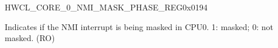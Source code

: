 \begin{register}{H}{WCL\_CORE\_0\_NMI\_MASK\_PHASE\_REG}{0x0194}\label{regdesc:WCLCORE0NMIMASKPHASEREG}
%
%
\regnewline%
\begin{regdesc}\begin{reglist}
\label{fielddesc:WCLCORE0NMIMASKPHASE}\item [WCL\_CORE\_0\_NMI\_MASK\_PHASE] Indicates if the NMI interrupt is being masked in CPU0. 1: masked; 0: not masked. (RO)
\end{reglist}\end{regdesc}
\end{register}


























































